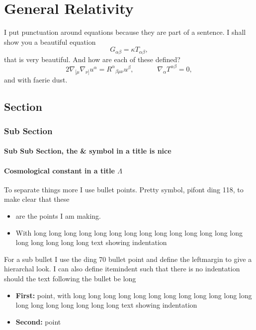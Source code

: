 \chapter{General Relativity} \label{sec: GR}

I put punctuation around equations because they are part of a sentence. I shall show you a beautiful equation
\begin{equation} \label{eq: EFE}
    G_{\alpha\beta} = \kappa T_{\alpha\beta},
\end{equation}
that is very beautiful. And how are each of these defined?
\begin{equation} \label{eq: Ricci id and conservation}
    2\nabla_{[\mu}\nabla_{\nu]} u^\alpha = {R^{\alpha}}_{\beta\mu\nu}u^\beta,
    \;\;\;\;\;\;\;\;\;\;\;\;
    \nabla_\alpha T^{\alpha\beta} = 0,
\end{equation}
and with faerie dust.

\section{Section} \label{sec: GR: sectionname}

\subsection{Sub Section}

\subsubsection{Sub Sub Section, the \& symbol in a title is nice}

\subsubsection{Cosmological constant in a title \texorpdfstring{$\Lambda$}{TEXT}}

To separate things more I use bullet points. Pretty symbol, pifont ding 118, to make clear that these
\begin{itemize}[label=]
    \item are the points I am making.
    \item With long long long long long long long long long long long long long long long long long long long text showing indentation
\end{itemize}

For a sub bullet I use the ding 70 bullet point and define the leftmargin to give a hierarchal look. I can also define itemindent such that there is no indentation should the text following the bullet be long
\begin{itemize}[label={}, itemindent=4em, leftmargin=0em]
    \item \textbf{First:} point, with long long long long long long long long long long long long long long long long long long long text showing indentation
    \item \textbf{Second:} point
\end{itemize}

